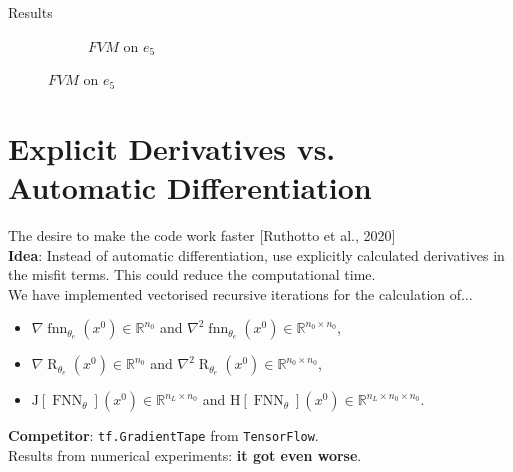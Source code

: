 \documentclass[9pt]{beamer}
\begin{document}
\begin{frame}{Results}
\begin{figure}[H]
\begin{center}
\begin{subfigure}[b]{0.4\textwidth}
\begin{center}
                \end{center}
                \caption{$FVM$ on $e_5$}
            \end{subfigure}
        \end{center}
    \end{figure}
\end{frame}


\section{Explicit Derivatives vs. \\ Automatic Differentiation}



\begin{frame}{The desire to make the code work faster}
    \vspace{-1\baselineskip}\hfill{\tiny{[Ruthotto et al., 2020]}} \\
    \textbf{Idea}: Instead of automatic differentiation, use explicitly calculated derivatives in the misfit terms. This could reduce the computational time. \\
    \vspace{3mm}
    We have implemented vectorised recursive iterations for the calculation of$\ldots$ \\
    \begin{itemize}
        \item $\nabla \operatorname{fnn}_{\theta_e} \left( x^0 \right) \in \mathbb{R}^{n_0}$ and $\nabla^2 \operatorname{fnn}_{\theta_e} \left( x^0 \right) \in \mathbb{R}^{n_0 \times n_0}$,
        \item $\nabla \operatorname{R}_{\theta_e} \left( x^0 \right) \in \mathbb{R}^{n_0}$ and $\nabla^2 \operatorname{R}_{\theta_e} \left( x^0 \right) \in \mathbb{R}^{n_0 \times n_0}$,
        \item $\mathrm{J} \left[ \operatorname{FNN}_{\theta} \right]\left(x^0\right) \in \mathbb{R}^{n_L \times n_0}$ and $\mathrm{H} \left[\operatorname{FNN}_{\theta} \right]\left(x^0\right) \in \mathbb{R}^{n_L \times n_0 \times n_0}$.
    \end{itemize}
    \vspace{3mm}
    \textbf{Competitor}: \lstinline!tf.GradientTape! from \lstinline!TensorFlow!. \\
    \vspace{7mm}
    Results from numerical experiments: \textbf{it got even worse}. 
\end{frame}
\end{document}

